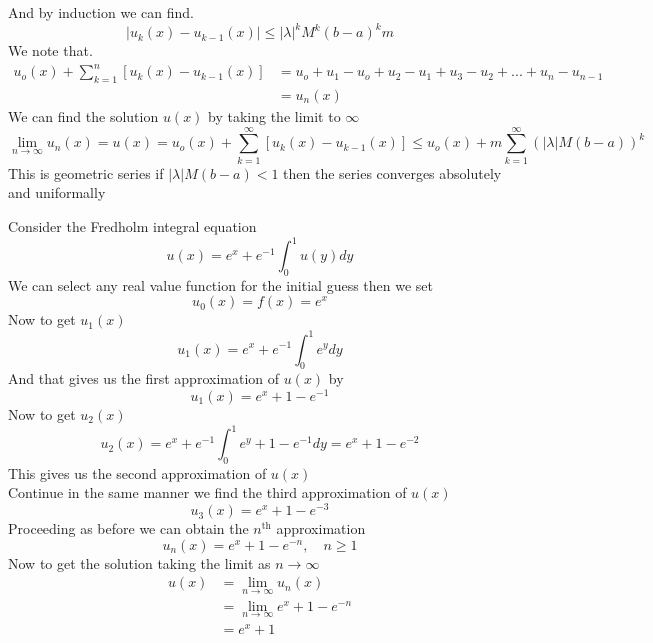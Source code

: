 \documentclass[]{article}
\begin{document}
And by induction we can find.
\[
    |u_{k}(x) - u_{k-1}(x)| \leq |\lambda|^kM^k {(b-a)}^k m    
\]
We note that.
\begin{align*}
u_o(x) + \sum_{k=1}^{n} [u_{k}(x) - u_{k-1}(x)] &= u_o + u_1 - u_o + u_2 - u_1 + u_3 - u_2 + ...+u_n - u_{n-1}
\\
&= u_n(x)
\end{align*}
We can find the solution $u(x)$ by taking the limit to $\infty$
\[
    \lim_{n\to\infty} u_n(x) = u(x) = u_o(x) + \sum_{k=1}^{\infty} [u_{k}(x) - u_{k-1}(x)] \leq u_o(x) + m\sum_{k=1}^{\infty} {(|\lambda|M(b-a))}^k    
\]
This is geometric series if $|\lambda|M(b-a) < 1$ then the series converges absolutely and uniformally
\begin{example}
    Consider the Fredholm integral equation 
    \[
        u(x) = e^x + e^{-1}\int_{0}^{1}u(y)dy    
    \]
    We can select any real value function for the initial guess then we set 
    \[
    u_0(x) =f(x) =e^x 
    \]
    Now to get $u_1(x)$
    \[
        u_1(x) = e^x + e^{-1}\int_{0}^{1}e^y dy        
    \]
    And that gives us the first approximation of $u(x)$ by
    \[
        u_1(x) = e^x + 1 - e^{-1} 
    \]
    Now to get $u_2(x)$
    \[
        u_2(x) = e^x + e^{-1}\int_{0}^{1}e^y + 1 - e^{-1}dy = e^x + 1 - e^{-2}
    \]
    This gives us the second approximation of $u(x)$
    \\
    Continue in the same manner we find the third approximation of $u(x)$
    \[
        u_3(x) = e^x + 1 - e^{-3}
    \]
    Proceeding as before we can obtain the $n^{\text{th}}$ approximation
    \[
        u_n(x) = e^x + 1 - e^{-n} , \quad n \geq 1
    \]
    Now to get the solution taking the limit as $n \to \infty$
    \begin{align*}
        u(x) &= \lim_{n\to\infty} u_n(x)
        \\
        &= \lim_{n\to\infty} e^x + 1 - e^{-n}
        \\
        &= e^x + 1
    \end{align*}
\end{example}
\end{document}
